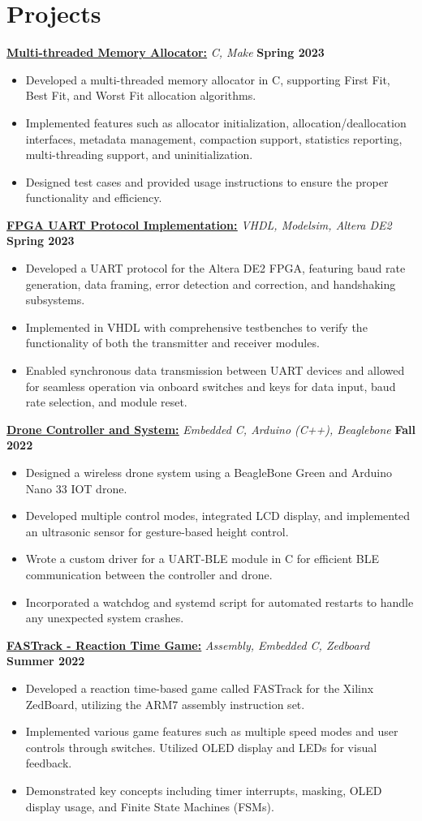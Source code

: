 \documentclass[letterpaper,11pt]{article}
\newcommand{\Item} [1] {
    \item\small{{#1 \vspace{-2pt}}}
}
\newcommand{\resumeItemListStart} [0] {
    \vspace{1pt}
    \begin{itemize}[leftmargin=*,topsep=0pt,itemsep=-2pt]
}
\newcommand{\resumeItemListEnd} [0] {
    \end{itemize}
    \vspace{3pt}
}
\begin{document}
    \section{Projects}
    \href{https://github.com/SatireSage/Multi-threaded-Memory-Allocator}{ \underline{\textbf{Multi-threaded Memory Allocator:}}} {\sl C, Make\/} \hfill \textbf{Spring 2023}
    \resumeItemListStart{}
        \Item{Developed a multi-threaded memory allocator in C, supporting First Fit, Best Fit, and Worst Fit allocation algorithms.}
        \Item{Implemented features such as allocator initialization, allocation/deallocation interfaces, metadata management, compaction support, statistics reporting, multi-threading support, and uninitialization.}
        \Item{Designed test cases and provided usage instructions to ensure the proper functionality and efficiency.}
    \resumeItemListEnd{}
    \href{https://github.com/SatireSage/FPGA-UART-Protocol}{ \underline{\textbf{FPGA UART Protocol Implementation:}}} {\sl VHDL, Modelsim, Altera DE2\/} \hfill \textbf{Spring 2023}
    \resumeItemListStart{}
        \Item{Developed a UART protocol for the Altera DE2 FPGA, featuring baud rate generation, data framing, error detection and correction, and handshaking subsystems.}
        \Item{Implemented in VHDL with comprehensive testbenches to verify the functionality of both the transmitter and receiver modules.}
        \Item{Enabled synchronous data transmission between UART devices and allowed for seamless operation via onboard switches and keys for data input, baud rate selection, and module reset.}
    \resumeItemListEnd{}
    \href{https://github.com/SatireSage/Dronee}{ \underline{\textbf{Drone Controller and System:}}} {\sl Embedded C, Arduino (C++), Beaglebone\/} \hfill \textbf{Fall 2022}
    \resumeItemListStart{}
        \Item{Designed a wireless drone system using a BeagleBone Green and Arduino Nano 33 IOT drone.}
        \Item{Developed multiple control modes, integrated LCD display, and implemented an ultrasonic sensor for gesture-based height control.}
        \Item{Wrote a custom driver for a UART-BLE module in C for efficient BLE communication between the controller and drone.}
        \Item{Incorporated a watchdog and systemd script for automated restarts to handle any unexpected system crashes.}
    \resumeItemListEnd{}
    \href{https://github.com/SatireSage/FASTrack}{ \underline{\textbf{FASTrack - Reaction Time Game:}}} {\sl Assembly, Embedded C, Zedboard\/} \hfill \textbf{Summer 2022}
    \resumeItemListStart{}
        \Item{Developed a reaction time-based game called FASTrack for the Xilinx ZedBoard, utilizing the ARM7 assembly instruction set.}
        \Item{Implemented various game features such as multiple speed modes and user controls through switches. Utilized OLED display and LEDs for visual feedback.}
        \Item{Demonstrated key concepts including timer interrupts, masking, OLED display usage, and Finite State Machines (FSMs).}
    \resumeItemListEnd{}
\end{document}
